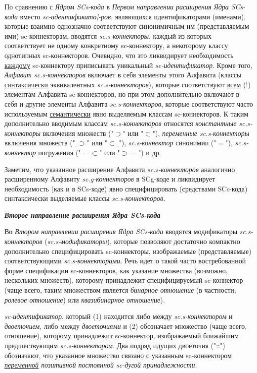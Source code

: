 По сравнению с \textit{Ядром SCs-кода} в \textit{Первом направлении расширения Ядра SCs-кода} вместо \textit{sc-идентификато|-ров}, являющихся идентификаторами (именами), которые взаимно однозначно соответствуют синонимичным им (представляемым ими) sc-коннекторам, вводятся \textit{sc.s-коннекторы}, каждый из которых соответствует не одному конкретному sc-коннектору, а некоторому классу однотипных sc-коннекторов. Очевидно, что это ликвидирует необходимость \uline{каждому} sc-коннектору приписывать уникальный \textit{sc-идентификатор}. Кроме того, \textit{Алфавит sc.s-коннекторов} включает в себя элементы этого Алфавита (классы \uline{синтаксически} эквивалентных \textit{sc.s-коннекторов}), которые соответствуют \uline{всем} (!) элементам Алфавита sc-коннекторов, но при этом дополнительно включают в себя и другие элементы Алфавита \textit{sc.s-коннекторов}, которые соответствуют часто используемым \uline{семантически} явно выделяемым классам sc-коннекторов. К таким дополнительно вводимым классам \textit{sc.s-коннекторов} относятся \textit{константные sc.s-коннекторы} включения множеств ("$\supset$"{} или "$\subset$"{}), \textit{переменные sc.s-коннекторы} включения множеств ("$\_\supset$"{} или "$\subset\_$"{}), \textit{sc.s-коннектор} синонимии ("$=$"{}), \textit{sc.s-коннектор} погружения ("$=\subset$"{} или "$\supset=$"{}) и др.

Заметим, что указанное расширение Алфавита \textit{sc.s-коннекторов} аналогично расширенному Алфавиту \textit{sc.g-коннекторов} в SCg-коде и ликвидирует необходимость (как и в SCs-коде) явно специфицировать (средствами SCs-кода) синтаксически выделяемые классы \textit{sc.s-коннекторов}.


\textbf{\textit{Второе направление расширения Ядра SCs-кода}}

Во \textit{Втором направлении расширения Ядра SCs-кода} вводятся модификаторы \textit{sc.s-коннекторов} (\textit{\mbox{sc.s-модификаторы}}), которые позволяют достаточно компактно дополнительно специфицировать \mbox{sc-коннекторы}, изображаемые (представляемые) соответствующими \textit{sc.s-коннекторами}. Речь идет о такой часто востребованной форме спецификации sc-коннекторов, как указание множества (возможно, нескольких множеств), которому принадлежит специфицируемый  sc-коннектор (чаще всего, таким множеством является \textit{бинарное отношение} (в частности, \textit{ролевое отношение}) или \textit{квазибинарное отношение}).

\begin{SCn}
\begin{scnindent}
\end{scnindent}	
\textit{sc-идентификатор}, который (1) находится либо между \textit{sc.s-коннектором} и \textit{двоеточием}, либо между \textit{двоеточиями} и (2) обозначает множество (чаще всего, отношение), которому принадлежит sc-коннектор, изображаемый ближайшим предшествующим \textit{sc.s-коннектором}. Два подряд идущих двоеточия ("::"{}) обозначают, что указанное множество связано с указанным sc-коннектором \textit{\uline{переменной} позитивной постоянной sc-дугой принадлежности}.
\end{SCn}

